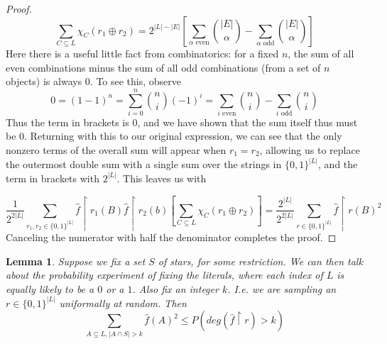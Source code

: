 \documentclass{article}
\theoremstyle{definition}
\theoremstyle{plain}
\theoremstyle{theorem}
\newtheorem{lemma}{Lemma}[section]
\begin{document}
\begin{proof}
\[ \sum_{C \subseteq L} \chi_C(r_1 \oplus r_2) = 2^{|L|-|E|}\left[ \sum_{\alpha \textrm{ even}} {|E| \choose \alpha} - \sum_{\alpha \textrm{ odd}} {|E| \choose \alpha} \right] \]
Here there is a useful little fact from combinatorics: for a fixed $n$, the sum of all even combinations minus the sum of all odd combinations (from a set of $n$ objects) is always $0$. To see this, observe
\[ 0 = (1-1)^n = \sum_{i=0}^n {n \choose i} (-1)^i = \sum_{i \textrm{ even}} {n \choose i} - \sum_{i \textrm{ odd}} {n \choose i} \]
Thus the term in brackets is $0$, and we have shown that the sum itself thus must be $0$. Returning with this to our original expression, we can see that the only nonzero terms of the overall sum will appear when $r_1 = r_2$, allowing us to replace the outermost double sum with a single sum over the strings in $\{0,1\}^{|L|}$, and the term in brackets with $2^{|L|}$. This leaves us with

 \[	\frac{1}{2^{2|L|}} \sum_{r_1,r_2 \in \{0,1\}^{|L|}} \hat{f}\restriction r_1(B) \hat{f}\restriction r_2(b) \left[ \sum_{C \subseteq L} \chi_C(r_1 \oplus r_2) \right] = \frac{2^{|L|}}{2^{2|L|}} \sum_{r \in \{0,1\}^{|L|}} \hat{f}\restriction r (B)^2  \]
Canceling the numerator with half the denominator completes the proof.
\end{proof}
\begin{lemma}
	Suppose we fix a set $S$ of stars, for some restriction. We can then talk about the probability experiment of fixing the literals, where each index of $L$ is equally likely to be a $0$ or a $1$. Also fix an integer $k$. I.e. we are sampling an $r \in \{0,1\}^{|L|}$ uniformally at random. Then
	\[ \sum_{A \subseteq L, |A \cap S| > k} \hat{f}(A)^2 \leq P(deg(\hat{f} \restriction r) > k) \]
\end{lemma}
\end{document}
